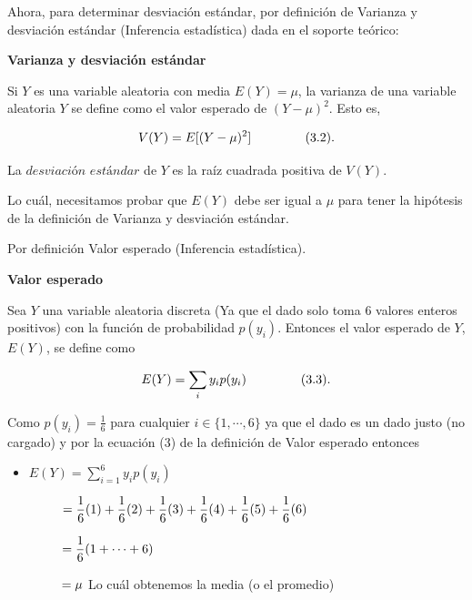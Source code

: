 \documentclass[
]{article}
\begin{document}
\newpage

Ahora, para determinar desviación estándar, por definición de Varianza y desviación estándar (Inferencia estadística) dada en el soporte teórico:

\begin{caja}

\textbf{Varianza y desviación estándar}

Si $Y$ es una variable aleatoria con media $E(Y)=\mu$, la varianza de una variable aleatoria $Y$ se define como el valor esperado de $(Y-\mu)^2$. Esto es,

$$V(Y)= E[(Y-\mu)^2] \hspace{1.5cm} (3.2).$$ 

La $desviación$ $estándar$ de $Y$ es la raíz cuadrada positiva de $V(Y)$.
\end{caja}

Lo cuál, necesitamos probar que $E(Y)$ debe ser igual a $\mu$ para tener la hipótesis de la definición de Varianza y desviación estándar.

Por definición Valor esperado (Inferencia estadística).

\begin{caja}

\textbf{Valor esperado}

Sea $Y$ una variable aleatoria discreta (Ya que el dado solo toma 6 valores enteros positivos) con la función de probabilidad $p(y_{i})$. Entonces el valor esperado de $Y$, $E(Y)$, se define como

$$E(Y) = \sum_{i} y_{i}p(y_{i}) \hspace{1.5cm} (3.3).$$
\end{caja}

Como $p(y_{i}) = \displaystyle \frac{1}{6}$ para cualquier $i \in \{1,\cdots,6\}$ ya que el dado es un dado justo (no cargado) y por la ecuación (3) de la definición de Valor esperado entonces 

\begin{itemize}

\item $\displaystyle E(Y) = \sum_{i=1}^{6} y_{i}p(y_{i})$

$\hspace{0.9cm} = \displaystyle \frac{1}{6}(1) +  \frac{1}{6}(2)+  \frac{1}{6}(3)+  \frac{1}{6}(4)+  \frac{1}{6}(5)+  \frac{1}{6}(6)$ 
 
 $\hspace{0.9cm} = \displaystyle \frac{1}{6} ( 1 + \cdots + 6 )$

 $\hspace{0.9cm} = \mu$ Lo cuál obtenemos la media (o el promedio)

\end{itemize}
\end{document}
